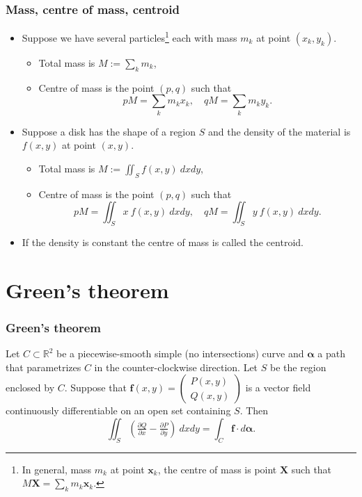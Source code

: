 \documentclass[aspectratio=169,handout]{beamer}
\newcommand{\bR}{\mathbb{R}} %
\newcommand{\ff}{\mathbf{f}}
\newcommand{\xx}{\mathbf{x}}
\newcommand{\aalpha}{\boldsymbol{\alpha}}
\begin{document}
\begin{frame}
    \frametitle{Mass, centre of mass, centroid}


    \begin{itemize}
        \item Suppose we have several particles\footnote{In general, mass \(m_k\) at point \(\xx_k\), the centre of mass is point \(\mathbf{X}\) such that \( M\mathbf{X} = \sum_{k} m_k \xx_k\).} each with mass \(m_k\) at point \((x_k,y_k)\).
            \begin{itemize}
                \item Total mass is \(M := \sum_{k} m_k\),
                \item Centre of mass is the point \((p,q)\) such that 
                \[ 
                    p M = \sum_{k} m_k x_k,
                    \quad 
                    q M = \sum_{k} m_k y_k.
                \] 
            \end{itemize}        
        \item Suppose a disk has the shape of a region \(S\) and the density of the material is \(f(x,y)\) at point \((x,y)\).
        \begin{itemize}
            \item Total mass is \(M := \iint_{S} f(x,y) \ dxdy\),
            \item Centre of mass is the point \((p,q)\) such that
            \[
                p M = \iint_{S} x \ f(x,y) \ dxdy, 
                \quad
                q M = \iint_{S} y \ f(x,y) \ dxdy.
            \] 
        \end{itemize}
        \item If the density is constant the centre of mass is called the centroid.
    \end{itemize}


\end{frame}

\section{Green's theorem}

\begin{frame}
    \frametitle{Green's theorem}

    \begin{theorem}
        Let \(C\subset\bR^2\) be a piecewise-smooth simple (no intersections) curve and \(\aalpha\) a path that parametrizes \(C\) in the counter-clockwise direction. 
        Let \(S\) be the region enclosed by \(C\).
        Suppose that \(\ff(x,y) = \left(\begin{smallmatrix}
            P(x,y) \\ Q(x,y)
        \end{smallmatrix}\right)\) is a vector field continuously differentiable  on an open set containing \(S\).
        Then
        \[
            \iint_{S} \left(\tfrac{\partial Q}{\partial x} - \tfrac{\partial P}{\partial y}\right) \ dxdy = \int_{C} \ff \cdot d\aalpha.
        \]
    \end{theorem}


\end{frame}
\end{document}
